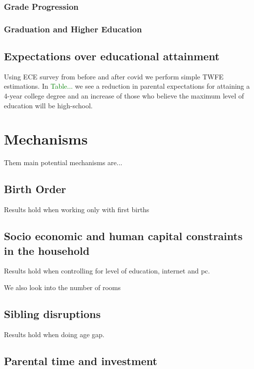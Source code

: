\subsubsection{Grade Progression}

\subsubsection{Graduation and Higher Education}

\subsection{Expectations over educational attainment}

Using ECE survey from before and after covid we perform simple TWFE estimations. In \textcolor{green}{Table...} we see a reduction in parental expectations for attaining a 4-year college degree and an increase of those who believe the maximum level of education will be high-school.


\section{Mechanisms}\label{sec:mechanisms}

Them main potential mechanisms are...

\subsection{Birth Order}

Results hold when working only with first births

\subsection{Socio economic and human capital constraints in the household}

Results hold when controlling for level of education, internet and pc.

We also look into the number of rooms

\subsection{Sibling disruptions}

Results hold when doing age gap.

\subsection{Parental time and investment}

